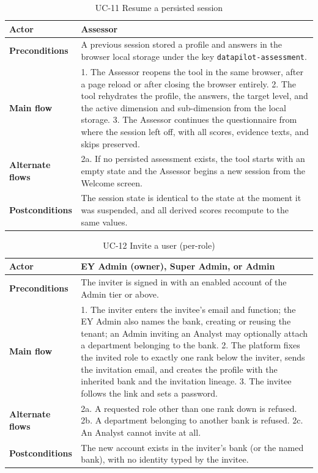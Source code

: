\begin{table}[H]
\centering
\caption{UC-11 Resume a persisted session}
\label{tab:uc11}
\begin{tabular}{|p{3cm}|p{12cm}|}
\hline
\textbf{Actor} & Assessor \\
\hline
\textbf{Preconditions} & A previous session stored a profile and answers in the browser local storage under the key \texttt{datapilot-assessment}. \\
\hline
\textbf{Main flow} & 1. The Assessor reopens the tool in the same browser, after a page reload or after closing the browser entirely. 2. The tool rehydrates the profile, the answers, the target level, and the active dimension and sub-dimension from the local storage. 3. The Assessor continues the questionnaire from where the session left off, with all scores, evidence texts, and skips preserved. \\
\hline
\textbf{Alternate flows} & 2a. If no persisted assessment exists, the tool starts with an empty state and the Assessor begins a new session from the Welcome screen. \\
\hline
\textbf{Postconditions} & The session state is identical to the state at the moment it was suspended, and all derived scores recompute to the same values. \\
\hline
\end{tabular}
\end{table}

\begin{table}[H]
\centering
\caption{UC-12 Invite a user (per-role)}
\label{tab:uc12}
\begin{tabular}{|p{3cm}|p{12cm}|}
\hline
\textbf{Actor} & EY Admin (owner), Super Admin, or Admin \\
\hline
\textbf{Preconditions} & The inviter is signed in with an enabled account of the Admin tier or above. \\
\hline
\textbf{Main flow} & 1. The inviter enters the invitee's email and function; the EY Admin also names the bank, creating or reusing the tenant; an Admin inviting an Analyst may optionally attach a department belonging to the bank. 2. The platform fixes the invited role to exactly one rank below the inviter, sends the invitation email, and creates the profile with the inherited bank and the invitation lineage. 3. The invitee follows the link and sets a password. \\
\hline
\textbf{Alternate flows} & 2a. A requested role other than one rank down is refused. 2b. A department belonging to another bank is refused. 2c. An Analyst cannot invite at all. \\
\hline
\textbf{Postconditions} & The new account exists in the inviter's bank (or the named bank), with no identity typed by the invitee. \\
\hline
\end{tabular}
\end{table}

